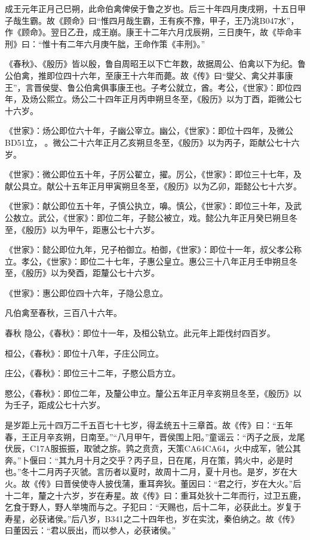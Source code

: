 \documentclass[]{article}
\begin{document}
成王元年正月己巳朔，此命伯禽俾侯于鲁之岁也。后三十年四月庚戌朔，十五日甲子哉生霸。故《顾命》曰``惟四月哉生霸，王有疾不豫，甲子，王乃洮B047水''，作《顾命》。翌日乙丑，成王崩。康王十二年六月戊辰朔，三日庚午，故《毕命丰刑》曰：``惟十有二年六月庚午朏，王命作策《丰刑》。''

《春秋》、《殷历》皆以殷，鲁自周昭王以下亡年数，故据周公、伯禽以下为纪。鲁公伯禽，推即位四十六年，至康王十六年而薨。故《传》曰``燮父、禽父并事康王''，言晋侯燮、鲁公伯禽俱事康王也。子考公就立，酋。考公，《世家》：即位四年，及炀公熙立。炀公二十四年正月丙申朔旦冬至，《殷历》以为丁酉，距微公七十六岁。

《世家》：炀公即位六十年，子幽公宰立。幽公，《世家》：即位十四年，及微公BD51立，。微公二十六年正月乙亥朔旦冬至，《殷历》以为丙子，距献公七十六岁。

《世家》：微公即位五十年，子厉公翟立，擢。厉公，《世家》：即位三十七年，及献公具立。献公十五年正月甲寅朔旦冬至，《殷历》以为乙卯，距懿公七十六岁。

《世家》：献公即位五十年，子慎公执立，嚊。慎公，《世家》：即位三十年，及武公敖立。武公，《世家》：即位二年，子懿公被立，戏。懿公九年正月癸巳朔旦冬至，《殷历》以为甲午，距惠公七十六岁。

《世家》：懿公即位九年，兄子柏御立。柏御，《世家》：即位十一年，叔父孝公称立。孝公，《世家》：即位二十七年，子惠公皇立。惠公三十八年正月壬申朔旦冬至，《殷历》以为癸酉，距釐公七十六岁。

《世家》：惠公即位四十六年，子隐公息立。

凡伯禽至春秋，三百八十六年。

春秋 隐公，《春秋》：即位十一年，及桓公轨立。此元年上距伐纣四百岁。

桓公，《春秋》：即位十八年，子庄公同立。

庄公，《春秋》：即位三十二年，子愍公启方立。

愍公，《春秋》：即位二年，及釐公申立。釐公五年正月辛亥朔旦冬至，《殷历》以为壬子，距成公七十六岁。

是岁距上元十四万二千五百七十七岁，得孟统五十三章首。故《传》曰：``五年春，王正月辛亥朔，日南至。''``八月甲午，晋侯围上阳。''童谣云：``丙子之辰，龙尾伏辰，C17A服振振，取虢之旂。鹑之贲贲，天策CA64CA64，火中成军，虢公其奔。''卜偃曰：``其九月十月之交乎？丙子旦，日在尾，月在策，鹑火中，必是时也。''冬十二月丙子灭虢。言历者以夏时，故周十二月，夏十月也。是岁，岁在大火。故《传》曰晋侯使寺人披伐蒲，重耳奔狄。董因曰：``君之行，岁在大火。''后十二年，釐之十六岁，岁在寿星。故《传》曰：重耳处狄十二年而行，过卫五鹿，乞食于野人，野人举塊而与之。子犯曰：``天赐也，后十二年，必获此土。岁复于寿星，必获诸侯。''后八岁，B341之二十四年也，岁在实沈，秦伯纳之。故《传》曰董因云：``君以辰出，而以参人，必获诸侯。''
\end{document}
